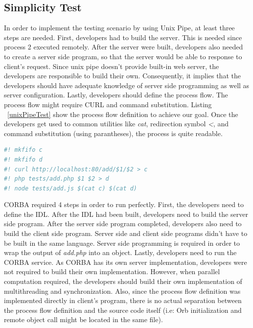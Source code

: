 \documentclass[conference]{IEEEtran}
\begin{document}
\subsection{Simplicity Test}

In order to implement the testing scenario by using Unix Pipe, at least three steps are needed. First,
developers had to build the server. This is needed since process 2 executed remotely. After the server
were built, developers also needed to create a server side program, so that the server would be able
to response to client's request. 
Since unix pipe doesn't provide built-in web server, the developers are responsible to build their own.
Consequently, it implies that the developers should have adequate knowledge of server side programming as 
well as server configuration. 
Lastly, developers should define the process flow. The process flow might require CURL and command 
substitution. Listing ~\ref{unixPipeTest} show the process flow definition to achieve our goal.
Once the developers get used to common utilities like {\it cat}, redirection symbol {\it <}, 
and command substitution (using parantheses), the process is quite readable.

\begin{lstlisting}[caption=Unix Pipe Process Flow, label=unixPipeTest, language=bash, basicstyle=\small, breaklines=true]
#! mkfifo c
#! mkfifo d
#! curl http://localhost:80/add/$1/$2 > c
#! php tests/add.php $1 $2 > d
#! node tests/add.js $(cat c) $(cat d)
\end{lstlisting}

CORBA required 4 steps in order to run perfectly. First, the developers need to define the IDL. 
After the IDL had been built, developers need to build the server side program. After the server
side program completed, developers also need to build the client side program. Server side and client side
programs didn't have to be built in the same language. Server side programming is required in order to wrap
the output of {\it add.php} into an object. Lastly, developers need to run the CORBA service.
As CORBA has its own server implementation, developers were not required to build their own implementation.
However, when parallel computation required, the developers should build their own implementation of 
multithreading and synchronization. Also, since the process flow definition was implemented directly in 
client's program, there is no actual separation between the process flow definition and the source code itself
(i.e: Orb initialization and remote object call might be located in the same file).
\end{document}
